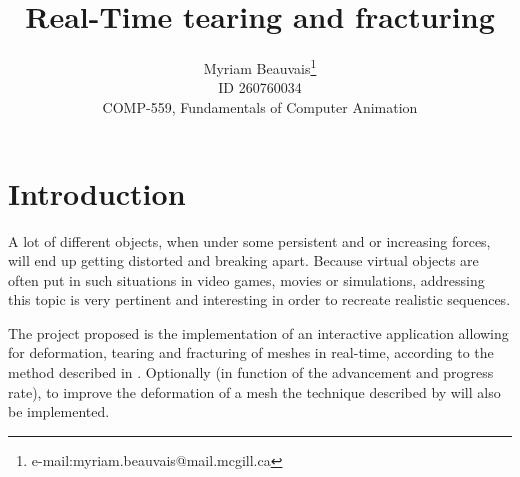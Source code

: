 \documentclass[tog]{acmsiggraph}
\title{Real-Time tearing and fracturing}
\author{Myriam Beauvais\thanks{e-mail:myriam.beauvais@mail.mcgill.ca} \\ ID 260760034 \\COMP-559, Fundamentals of Computer Animation}
\begin{document}


\maketitle

\copyrightspace

\section{Introduction}
A lot of different objects, when under some persistent and or increasing forces, will end up getting distorted and breaking apart. Because virtual objects are often put in such situations in video games, movies or simulations, addressing this topic is very pertinent and interesting in order to recreate realistic sequences.  

The project proposed is the implementation of an interactive application allowing for deformation, tearing and fracturing of meshes in real-time, according to the method described in \cite{Parker:2009:RTD}. Optionally (in function of the advancement and progress rate), to improve the deformation of a mesh the technique described by \cite{Rivers:2007:FFL} will also be implemented. 
\end{document}
